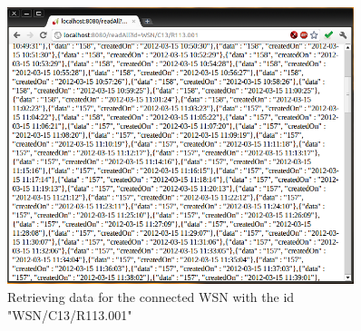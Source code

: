 \begin{figure}[H]
   \centering
   \includegraphics[width=0.9\textwidth]{pic/Web-server-readAll.png}%
   \caption{Retrieving data for the connected WSN with the id "WSN/C13/R113.001"}
   \label{web-server-readall-pic}%
\end{figure}
